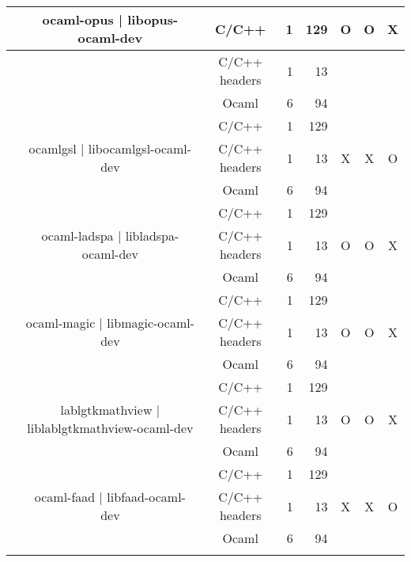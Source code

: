 \documentclass[11pt,a4paper]{article}
\begin{document}
\begin{table}[h,t]
\begin{tabular}{|>{\centering}m{3cm}| c|c|r|r| c| c|c|}
 &\multirow{3}{3cm}{ocaml-opus | libopus-ocaml-dev} & C/C++ & 1 & 129 & \multirow{3}{*}{O} & \multirow{3}{*}{O} & \multirow{3}{*}{X}\\
\cline{3-5}
& &                           C/C++ headers & 1 & 13 & & & \\
\cline{3-5}
& &                          Ocaml & 6 & 94 & & & \\
\cline{2-8}



 &\multirow{3}{3cm}{ocamlgsl | libocamlgsl-ocaml-dev} & C/C++ & 1 & 129 & \multirow{3}{*}{X} & \multirow{3}{*}{X} & \multirow{3}{*}{O}\\
\cline{3-5}
& &                           C/C++ headers & 1 & 13 & & & \\
\cline{3-5}
& &                          Ocaml & 6 & 94 & & & \\
\cline{2-8}




 &\multirow{3}{3cm}{ocaml-ladspa | libladspa-ocaml-dev} & C/C++ & 1 & 129 & \multirow{3}{*}{O} & \multirow{3}{*}{O} & \multirow{3}{*}{X}\\
\cline{3-5}
& &                           C/C++ headers & 1 & 13 & & & \\
\cline{3-5}
& &                          Ocaml & 6 & 94 & & & \\
\cline{2-8}

 &\multirow{3}{3cm}{ocaml-magic | libmagic-ocaml-dev} & C/C++ & 1 & 129 & \multirow{3}{*}{O} & \multirow{3}{*}{O} & \multirow{3}{*}{X}\\
\cline{3-5}
& &                           C/C++ headers & 1 & 13 & & & \\
\cline{3-5}
& &                          Ocaml & 6 & 94 & & & \\
\cline{2-8}

 &\multirow{3}{3cm}{lablgtkmathview | liblablgtkmathview-ocaml-dev} & C/C++ & 1 & 129 & \multirow{3}{*}{O} & \multirow{3}{*}{O} & \multirow{3}{*}{X}\\
\cline{3-5}
& &                           C/C++ headers & 1 & 13 & & & \\
\cline{3-5}
& &                          Ocaml & 6 & 94 & & & \\
\cline{2-8}

&\multirow{3}{3cm}{ocaml-faad | libfaad-ocaml-dev} & C/C++ & 1 & 129 & \multirow{3}{*}{X} & \multirow{3}{*}{X} & \multirow{3}{*}{O}\\
\cline{3-5}
& &                           C/C++ headers & 1 & 13 & & & \\
\cline{3-5}
& &                          Ocaml & 6 & 94 & & & \\
\cline{2-8}


\end{tabular}
\end{table}
\end{document}
